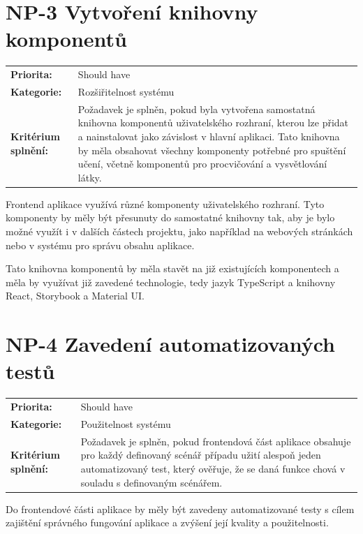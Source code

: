\section{NP-3 Vytvoření knihovny komponentů}\label{sec:np-component-library}

\begin{tabularx}{\linewidth}{lX}
    \textbf{Priorita:} & Should have \\
    \textbf{Kategorie:} & Rozšiřitelnost systému \\
    \textbf{Kritérium splnění:} & Požadavek je splněn, pokud byla vytvořena samostatná knihovna komponentů uživatelského rozhraní, kterou lze přidat a nainstalovat jako závislost v hlavní aplikaci. Tato knihovna by měla obsahovat všechny komponenty potřebné pro spuštění učení, včetně komponentů pro procvičování a vysvětlování látky. \\
\end{tabularx}

Frontend aplikace využívá různé komponenty uživatelského rozhraní. Tyto komponenty by měly být přesunuty do samostatné knihovny tak, aby je bylo možné využít i v dalších částech projektu, jako například na webových stránkách nebo v systému pro správu obsahu aplikace.

Tato knihovna komponentů by měla stavět na již existujících komponentech a měla by využívat již zavedené technologie, tedy jazyk TypeScript a knihovny React, Storybook a Material UI.

\section{NP-4 Zavedení automatizovaných testů}\label{sec:np-automated-tests}

\begin{tabularx}{\linewidth}{lX}
    \textbf{Priorita:} & Should have \\
    \textbf{Kategorie:} & Použitelnost systému \\
    \textbf{Kritérium splnění:} & Požadavek je splněn, pokud frontendová část aplikace obsahuje pro každý definovaný scénář případu užití alespoň jeden automatizovaný test, který ověřuje, že se daná funkce chová v souladu s definovaným scénářem. \\
\end{tabularx}

Do frontendové části aplikace by měly být zavedeny automatizované testy s cílem zajištění správného fungování aplikace a zvýšení její kvality a použitelnosti.

